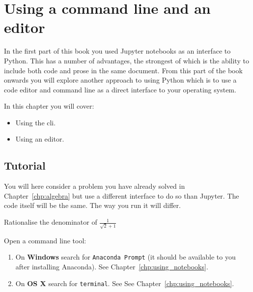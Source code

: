 \chapter{Using a command line and an editor}
\label{chp:cli}

In the first part of this book you used Jupyter notebooks as an interface to
Python. This has a number of advantages, the strongest of which is the ability
to include both code and prose in the same document. From this part of the book
onwards you will explore another approach to using Python which is to use 
a code editor and command line as a direct interface to your operating system.

\begin{note}
In this chapter you will cover:
\begin{itemize}
\item 

Using the cli.

\item 

Using an editor.

\end{itemize}
\end{note}





\section{Tutorial}

You will here consider a problem you have already solved in
Chapter~\ref{chp:algebra}
 but use a different interface to do so than Jupyter.
The code itself will be the same. The way you run it will differ.

Rationalise the denominator of \(\frac{1}{\sqrt{2} + 1}\)

Open a command line tool:

\begin{enumerate}

\item 

On \textbf{Windows} search for \texttt{Anaconda Prompt} (it should be available to you
after installing Anaconda). See Chapter~\ref{chp:using_notebooks}.

\item 

On \textbf{OS X} search for \texttt{terminal}. See
See Chapter~\ref{chp:using_notebooks}.


\end{enumerate}

